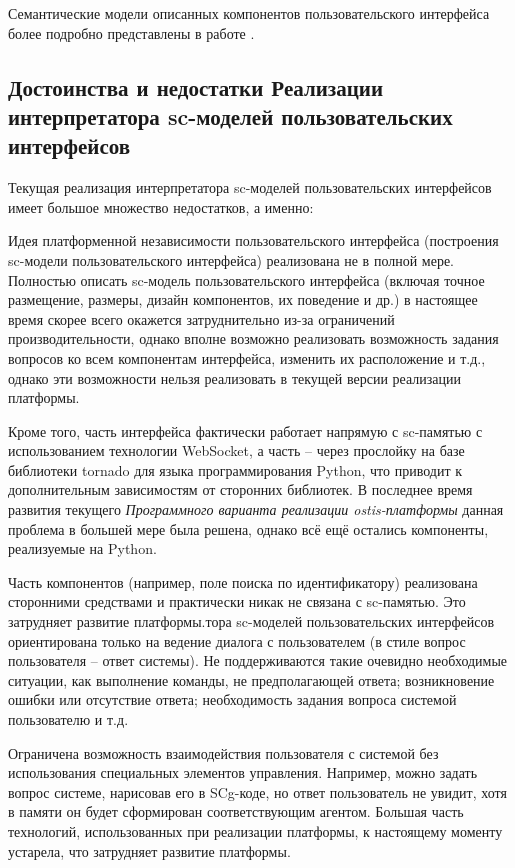 Семантические модели описанных компонентов пользовательского интерфейса более подробно представлены в работе \cite{sadouski2022semantic}.

\subsection{Достоинства и недостатки Реализации интерпретатора sc-моделей пользовательских интерфейсов}
\label{sec_soft_platform_sci_machine_problems}

Текущая реализация интерпретатора sc-моделей пользовательских интерфейсов имеет большое множество недостатков, а именно:
\begin{textitemize}
	\item Идея платформенной независимости пользовательского интерфейса (построения sc-модели пользовательского интерфейса) реализована не в полной мере. Полностью описать sc-модель пользовательского интерфейса (включая точное размещение, размеры, дизайн компонентов, их поведение и др.) в настоящее время скорее всего окажется затруднительно из-за ограничений производительности, однако вполне возможно реализовать возможность задания вопросов ко всем компонентам интерфейса, изменить их расположение и т.д., однако эти возможности нельзя реализовать в текущей версии реализации платформы.
	\item Кроме того, часть интерфейса фактически работает напрямую с sc-памятью с использованием технологии WebSocket, а часть -- через прослойку на базе библиотеки tornado для языка программирования Python, что приводит к дополнительным зависимостям от сторонних библиотек. В последнее время развития текущего \textit{Программного варианта реализации ostis-платформы} данная проблема в большей мере была решена, однако всё ещё остались компоненты, реализуемые на Python.
	\item Часть компонентов (например, поле поиска по идентификатору) реализована сторонними средствами и практически никак не связана с sc-памятью. Это затрудняет развитие платформы.тора sc-моделей пользовательских интерфейсов ориентирована только на ведение диалога с пользователем (в стиле вопрос пользователя -- ответ системы). Не поддерживаются такие очевидно необходимые ситуации, как выполнение команды, не предполагающей ответа; возникновение ошибки или отсутствие ответа; необходимость задания вопроса системой пользователю и т.д.
	\item Ограничена возможность взаимодействия пользователя с системой без использования специальных элементов управления. Например, можно задать вопрос системе, нарисовав его в SCg-коде, но ответ пользователь не увидит, хотя в памяти он будет сформирован соответствующим агентом. Большая часть технологий, использованных при реализации платформы, к настоящему моменту устарела, что затрудняет развитие платформы.

\end{textitemize}
